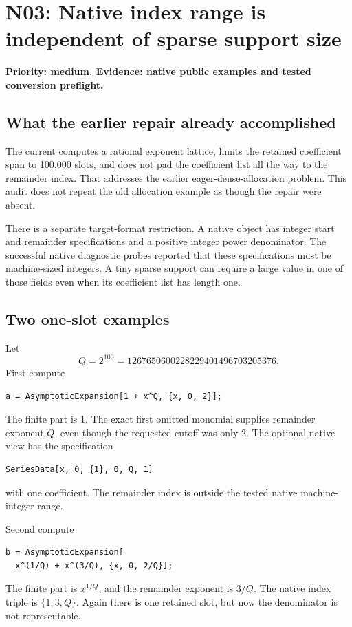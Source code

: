 \documentclass[11pt,a4paper]{article}
\newcommand{\code}[1]{\texttt{\detokenize{#1}}}
\newcommand{\finding}[2]{\Needspace{8\baselineskip}\section{#1: #2}}
\begin{document}
\finding{N03}{Native index range is independent of sparse support size}\label{sec:n03}
\textbf{Priority: medium. Evidence: native public examples and tested conversion preflight.}

\subsection{What the earlier repair already accomplished}
The current \code{makeRationalSeriesData} computes a rational exponent lattice, limits the retained coefficient span to 100,000 slots, and does not pad the coefficient list all the way to the remainder index. That addresses the earlier eager-dense-allocation problem. This audit does not repeat the old allocation example as though the repair were absent.\cite{repo-main,repo-status,review7,review8}

There is a separate target-format restriction. A native \code{SeriesData} object has integer start and remainder specifications and a positive integer power denominator. The successful native diagnostic probes reported that these specifications must be machine-sized integers. A tiny sparse support can require a large value in one of those fields even when its coefficient list has length one.

\subsection{Two one-slot examples}
Let
\[
 Q=2^{100}=1267650600228229401496703205376.
\]
First compute
\begin{lstlisting}
a = AsymptoticExpansion[1 + x^Q, {x, 0, 2}];
\end{lstlisting}
The finite part is 1. The exact first omitted monomial supplies remainder exponent \(Q\), even though the requested cutoff was only 2. The optional native view has the specification
\begin{lstlisting}
SeriesData[x, 0, {1}, 0, Q, 1]
\end{lstlisting}
with one coefficient. The remainder index is outside the tested native machine-integer range.

Second compute
\begin{lstlisting}
b = AsymptoticExpansion[
  x^(1/Q) + x^(3/Q), {x, 0, 2/Q}];
\end{lstlisting}
The finite part is \(x^{1/Q}\), and the remainder exponent is \(3/Q\). The native index triple is \(\{1,3,Q\}\). Again there is one retained slot, but now the denominator is not representable.
\end{document}
